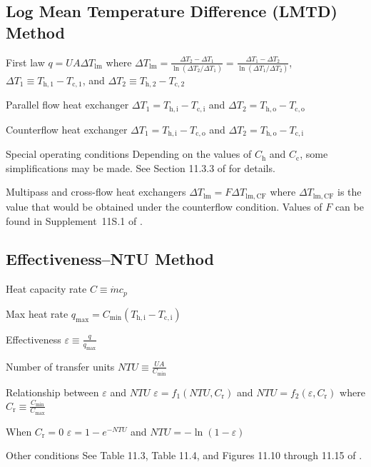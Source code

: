 \documentclass{article}
\begin{document}
\subsection{Log Mean Temperature Difference (LMTD) Method}
\label{sec:lmtd}

\begin{description*}
\item[First law]
  \(q = UA\Delta T_\mathrm{lm}\) where
  \(\Delta T_\mathrm{lm} = \frac{\Delta T_2 - \Delta T_1}{\ln(\Delta T_2 / \Delta T_1)}
  = \frac{\Delta T_1 - \Delta T_2}{\ln(\Delta T_1 / \Delta T_2)}\),
  \(\Delta T_1 \equiv T_{\mathrm{h},1} - T_{\mathrm{c},1}\), and
  \(\Delta T_2 \equiv T_{\mathrm{h},2} - T_{\mathrm{c},2}\)
\item[Parallel flow heat exchanger]
  \(\Delta T_1 = T_\mathrm{h,i} - T_\mathrm{c,i}\) and
  \(\Delta T_2 = T_\mathrm{h,o} - T_\mathrm{c,o}\)
\item[Counterflow heat exchanger]
  \(\Delta T_1 = T_\mathrm{h,i} - T_\mathrm{c,o}\) and
  \(\Delta T_2 = T_\mathrm{h,o} - T_\mathrm{c,i}\)
\item[Special operating conditions] Depending on the values of $C_\mathrm{h}$ and $C_\mathrm{c}$,
  some simplifications may be made. See Section 11.3.3 of \cite{hamt} for details.
\item[Multipass and cross-flow heat exchangers]
  \(\Delta T_\mathrm{lm} = F \Delta T_\mathrm{lm,CF}\) where $\Delta T_\mathrm{lm,CF}$ is the value
  that would be obtained under the counterflow condition. Values of $F$ can be found in
  Supplement~11S.1 of \cite{hamt}.
\end{description*}

\subsection{Effectiveness--NTU Method}
\label{sec:eff-ntu}

\begin{description*}
\item[Heat capacity rate]
  \(C \equiv \dot{m} c_p\)
\item[Max heat rate]
  \(q_\mathrm{max} = C_\mathrm{min}(T_\mathrm{h,i} - T_\mathrm{c,i})\)
\item[Effectiveness]
  \(\varepsilon \equiv \frac{q}{q_\mathrm{max}}\)
\item[Number of transfer units]
  \(\mathit{NTU} \equiv \frac{UA}{C_\mathrm{min}}\)
\item[Relationship between $\varepsilon$ and $\mathit{NTU}$]
  \(\varepsilon = f_1(\mathit{NTU}, C_\mathrm{r})\) and
  \(\mathit{NTU} = f_2(\varepsilon, C_\mathrm{r})\) where
  \(C_\mathrm{r} \equiv \frac{C_\mathrm{min}}{C_\mathrm{max}}\)
  \begin{description*}
  \item[When \(C_\mathrm{r} = 0\)]
    \(\varepsilon = 1 - e^{-\mathit{NTU}}\) and \(\mathit{NTU} = -\ln(1 - \varepsilon)\)
  \item[Other conditions] See Table 11.3, Table 11.4, and Figures 11.10 through 11.15 of \cite{hamt}.
  \end{description*}
\end{description*}
\end{document}
